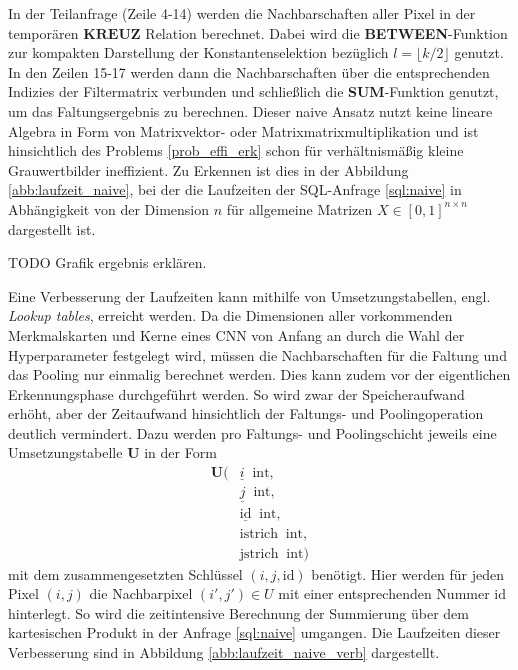In der Teilanfrage (Zeile 4-14) werden die Nachbarschaften aller Pixel in der temporären $\mathbf{KREUZ}$ Relation berechnet. Dabei wird die \textbf{BETWEEN}-Funktion zur kompakten Darstellung der Konstantenselektion bezüglich $l=\lfloor k/2 \rfloor$ genutzt. In den Zeilen 15-17 werden dann die Nachbarschaften über die entsprechenden Indizies der Filtermatrix verbunden und schließlich die \textbf{SUM}-Funktion genutzt, um das Faltungsergebnis zu berechnen. Dieser naive Ansatz nutzt keine lineare Algebra in Form von Matrixvektor- oder Matrixmatrixmultiplikation und ist hinsichtlich des Problems \ref{prob_effi_erk} schon für verhältnismäßig kleine Grauwertbilder ineffizient. Zu Erkennen ist dies in der Abbildung \ref{abb:laufzeit_naive}, bei der die Laufzeiten der SQL-Anfrage \ref{sql:naive} in Abhängigkeit von der Dimension $n$ für allgemeine Matrizen $X \in [0,1]^{n \times n}$ dargestellt ist.

TODO Grafik ergebnis erklären.

Eine Verbesserung der Laufzeiten kann mithilfe von Umsetzungstabellen, engl. \textit{Lookup tables}, erreicht werden. Da die Dimensionen aller vorkommenden Merkmalskarten und Kerne eines CNN von Anfang an durch die Wahl der Hyperparameter festgelegt wird, müssen die Nachbarschaften für die Faltung und das Pooling nur einmalig berechnet werden. Dies kann zudem vor der eigentlichen Erkennungsphase durchgeführt werden. So wird zwar der Speicheraufwand erhöht, aber der Zeitaufwand hinsichtlich der Faltungs- und Poolingoperation deutlich vermindert. Dazu werden pro Faltungs- und Poolingschicht jeweils eine Umsetzungstabelle \textbf{U} in der Form 
\begin{align*}
    \mathbf{U}( &\underline{i} \; \; \mathrm{int}, \\
    &\underline{j} \; \;\mathrm{int},\\
    &\underline{\text{id}} \; \; \mathrm{int}, \\
    &\text{istrich} \; \; \mathrm{int},\\
    &\text{jstrich}\; \; \mathrm{int})
\end{align*}
mit dem zusammengesetzten Schlüssel $(i,j,\text{id})$ benötigt. Hier werden für jeden Pixel $(i,j)$ die Nachbarpixel $(i', j') \in U$ mit einer entsprechenden Nummer $\text{id}$ hinterlegt. So wird die zeitintensive Berechnung der Summierung über dem  kartesischen Produkt in der Anfrage \ref{sql:naive} umgangen. Die Laufzeiten dieser Verbesserung sind in Abbildung \ref{abb:laufzeit_naive_verb} dargestellt.

